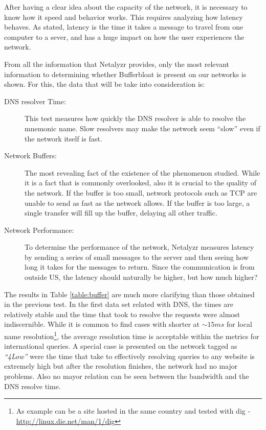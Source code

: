 After having a clear idea about the capacity of the network, it is necessary
to know how it speed and behavior works. This requires analyzing how
latency behaves. As stated, latency is the time it takes a message to travel
from one computer to a sever, and has a huge impact on how the user experiences
the network.

From all the information that Netalyzr provides, only
the most relevant information to determining whether Bufferbloat is present
on our networks is shown. For this, the data that will be take into consideration is:

\begin{description}

\item [DNS resolver Time:] This test measures how quickly the DNS
resolver is able to resolve the mnemonic name. Slow resolvers may make the
network seem ``slow'' even if the network itself is fast.

\item [Network Buffers:] The most revealing fact of the existence of the
phenomenon studied. While it is a fact that is commonly overlooked, also it is
crucial to the quality of the network. If the buffer is too small, network
protocols such as TCP are unable to send as fast as the network allows. If the
buffer is too large, a single transfer will fill up the buffer, delaying all
other traffic.

\item [Network Performance:] To determine the performance of the network,
Netalyzr measures latency by sending a series of small messages to the server
and then seeing how long it takes for the messages to return. Since the
communication is from outside US, the latency should naturally be higher, but
how much higher?
\end{description}


The results in Table \ref{table:buffer} are much more clarifying than those
obtained in the previous test. In the first data set related with DNS, the
times are relatively stable and the time that took to resolve the requests
were almost indiscernible. While it is common to find cases with shorter at
$\sim15ms$ for local name resolution\footnote{ As example can be a site hosted
in the same country and tested with dig -
\url{http://linux.die.net/man/1/dig}}, the average resolution time is
acceptable within the metrics for international queries. A special case is
presented on the network tagged as \textit{``4Low''} were the time that take
to effectively resolving queries to any website is extremely high but after
the resolution finishes, the network had no major problems. Also no mayor relation can be seen between the bandwidth and the
DNS resolve time.

